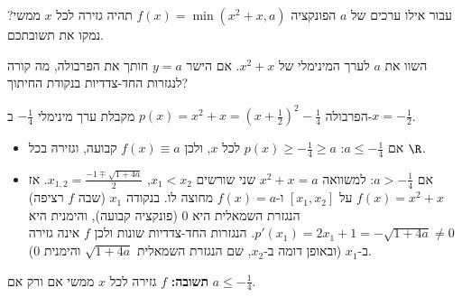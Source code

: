 
\begin{question}
עבור אילו ערכים של $a$ הפונקציה $f(x)=\min\left(x^2+x,a\right)$ תהיה גזירה לכל $x$ ממשי? נמקו את תשובתכם.
\end{question}

\begin{hint}
השוו את $a$ לערך המינימלי של $x^2+x$. אם הישר $y=a$ חותך את הפרבולה, מה קורה לנגזרות החד-צדדיות בנקודת החיתוך?
\end{hint}

\begin{solution}
הפרבולה $p(x)=x^2+x=\left(x+\frac12\right)^2-\frac14$ מקבלת ערך מינימלי $-\frac14$ ב-$x=-\frac12$.
\begin{itemize}
  \item אם $a\le-\frac14$: $p(x)\ge-\frac14\ge a$ לכל $x$, ולכן $f(x)\equiv a$ קבועה, וגזירה בכל $\R$.
  \item אם $a>-\frac14$: למשוואה $x^2+x=a$ שני שורשים $x_1<x_2$, $x_{1,2}=\frac{-1\mp\sqrt{1+4a}}{2}$. אז $f(x)=x^2+x$ על $[x_1,x_2]$ ו-$f(x)=a$ מחוצה לו. בנקודה $x_1$ (שבה $f$ רציפה) הנגזרת השמאלית היא $0$ (פונקציה קבועה), והימנית היא $p'(x_1)=2x_1+1=-\sqrt{1+4a}\neq0$. הנגזרות החד-צדדיות שונות ולכן $f$ אינה גזירה ב-$x_1$ (ובאופן דומה ב-$x_2$, שם הנגזרת השמאלית $\sqrt{1+4a}$ והימנית $0$).
\end{itemize}
\textbf{תשובה:} $f$ גזירה לכל $x$ ממשי אם ורק אם $\boxed{a\le-\frac14}$.
\end{solution}
